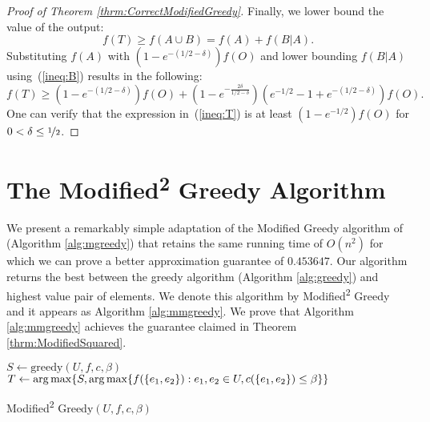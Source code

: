 \documentclass[a4paper]{article}
\begin{document}
\begin{proof}[Proof of Theorem \ref{thrm:CorrectModifiedGreedy}]
	Finally, we lower bound the value of the output:
	\begin{equation}
		f(T) \geq f(A \cup B) = f(A) + f(B | A).
	\end{equation}	
	Substituting $f(A)$ with $(1 - e^{-(1/2 - \delta)})f(O)$ and lower bounding $f(B|A)$ using~(\ref{ineq:B}) results in the following:
	\begin{equation}
		\label{ineq:T}
		f(T) \geq (1 - e^{-(1/2 - \delta)})f(O) + (1 - e^{-\frac{2\delta}{1/2 - \delta}})(e^{-1/2} - 1 + e^{-(1/2 - \delta)})f(O).
	\end{equation}
	One can verify that the expression in~(\ref{ineq:T}) is at least $(1-e^{-1/2})f(O)$ for $0 < \delta \leq \nicefrac[]{1}{2}$.
\end{proof}



\section{The Modified\textsuperscript{2} Greedy Algorithm}\label{sec:Modified2Greedy}
We present a remarkably simple adaptation of the Modified Greedy algorithm of \cite{khuller1999budgeted} (Algorithm \ref{alg:mgreedy}) that retains the same running time of $O(n^2)$ for which we can prove a better approximation guarantee of $0.453647$.
Our algorithm returns the best between the greedy algorithm (Algorithm \ref{alg:greedy}) and highest value pair of elements.
We denote this algorithm by Modified\textsuperscript{2} Greedy and it appears as Algorithm \ref{alg:mmgreedy}.
We prove that Algorithm \ref{alg:mmgreedy} achieves the guarantee claimed in Theorem \ref{thrm:ModifiedSquared}.




\begin{algorithm}
	$S \leftarrow \text{greedy}(U, f, c, \beta)$
	\\
	$T \leftarrow \arg\max\{S, \operatorname*{arg\,max} \{ f(\{ e_1,e_2\}):e_1,e_2\in U, c(\{e_1, e_2\} ) \leq \beta \} \}$
	\\
	\caption{Modified\textsuperscript{2} Greedy$(U, f, c, \beta)$}
	\label{alg:mmgreedy}
\end{algorithm}
\end{document}
